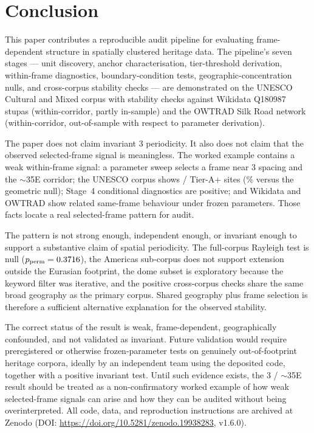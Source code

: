 \documentclass[12pt,a4paper]{article}
\newcommand{\degr}{\ifmmode{^\circ}\else\textdegree{}\fi}
\begin{document}
\section{Conclusion}
\label{sec:conclusion}

This paper contributes a reproducible audit pipeline for evaluating
frame-dependent structure in spatially clustered heritage data. The
pipeline's seven stages --- unit discovery, anchor characterisation,
tier-threshold derivation, within-frame diagnostics,
boundary-condition tests, geographic-concentration nulls, and
cross-corpus stability checks --- are demonstrated on the UNESCO
Cultural and Mixed corpus with stability checks against Wikidata
Q180987 stupas (within-corridor, partly in-sample) and the OWTRAD
Silk Road network (within-corridor, out-of-sample with respect to
parameter derivation).

The paper does not claim invariant 3\degr{} periodicity. It also does
not claim that the observed selected-frame signal is meaningless. The
worked example contains a weak within-frame signal: a parameter sweep
selects a frame near 3\degr{} spacing and the $\sim$35\degr{}E
corridor; the UNESCO corpus shows \NclusterAp/\NclusterTotal{}
Tier-A+ sites (\clusterApRate\% versus the \NullRateAp{} geometric
null); Stage~4 conditional diagnostics are positive; and Wikidata and
OWTRAD show related same-frame behaviour under frozen parameters.
Those facts locate a real selected-frame pattern for audit.

The pattern is not strong enough, independent enough, or invariant
enough to support a substantive claim of spatial periodicity. The
full-corpus Rayleigh test is null
($p_{\mathrm{perm}} = 0.3716$), the Americas sub-corpus
does not support extension outside the Eurasian footprint, the dome
subset is exploratory because the keyword filter was iterative, and
the positive cross-corpus checks share the same broad geography as the
primary corpus. Shared geography plus frame selection is therefore a
sufficient alternative explanation for the observed stability.

The correct status of the result is weak, frame-dependent,
geographically confounded, and not validated as invariant. Future
validation would require preregistered or otherwise frozen-parameter
tests on genuinely out-of-footprint heritage corpora, ideally by an
independent team using the deposited code, together with a positive
invariant test. Until such evidence exists, the 3\degr{} /
$\sim$35\degr{}E result should be treated as a non-confirmatory worked
example of how weak selected-frame signals can arise and how they can
be audited without being overinterpreted. All code, data, and
reproduction instructions are archived at Zenodo
(DOI: \url{https://doi.org/10.5281/zenodo.19938283}, v1.6.0).
\end{document}
